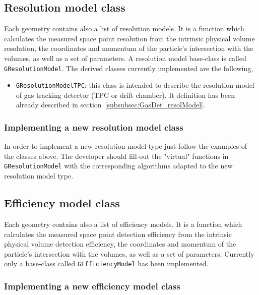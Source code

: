 \subsection{Resolution model class}
\label{subsec:resolution_model}

Each geometry contains also a list of resolution models. It is a function which calculates the measured space point resolution from the intrinsic physical volume resolution, 
the coordinates and momentum of the particle's intersection with the volumes, as well as a set of parameters. A resolution model base-class is called {\tt GResolutionModel}. 
The derived classes currently implemented are the following,

\begin{itemize}
  \item  {\tt GResolutionModelTPC}: this class is intended to describe the resolution model of gas tracking detector (TPC or drift chamber). It definition has been already described in 
  section~\ref{subsubsec:GasDet_resolModel}.
\end{itemize}

\subsubsection{Implementing a new resolution model class}

In order to implement a new resolution model type just follow the examples of the classes above. The developer should fill-out the "virtual" functions in {\tt GResolutionModel} with the 
corresponding algorithms adapted to the new resolution model type.

\subsection{Efficiency model class}
\label{subsec:efficiency_model}

Each geometry contains also a list of efficiency models. It is a function which calculates the measured space point detection efficiency from the intrinsic physical volume detection efficiency, 
the coordinates and momentum of the particle's intersection with the volumes, as well as a set of parameters. Currently only a base-class called {\tt GEfficiencyModel} has been implemented. 

\subsubsection{Implementing a new efficiency model class}

